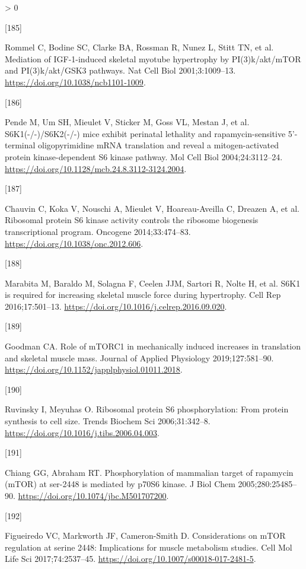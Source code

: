 \documentclass[twoside,10pt]{gihclass} %
\newlength{\cslhangindent}
\newlength{\csllabelwidth}
\newenvironment{CSLReferences}[3] %
 {%
  \setlength{\parindent}{0pt}
  \ifodd #1 \everypar{\setlength{\hangindent}{\cslhangindent}}\ignorespaces\fi
  \ifnum #2 > 0
  \setlength{\parskip}{#2\baselineskip}
  \fi
 }%
 {}
\newcommand{\CSLLeftMargin}[1]{\parbox[t]{\maxof{\widthof{#1}}{\csllabelwidth}}{#1}}
\newcommand{\CSLRightInline}[1]{\parbox[t]{\linewidth}{#1}}
\begin{document}
\begin{CSLReferences}{0}{0}
\leavevmode\hypertarget{ref-RN783}{}%
\CSLLeftMargin{{[}185{]} }
\CSLRightInline{Rommel C, Bodine SC, Clarke BA, Rossman R, Nunez L, Stitt TN, et al. Mediation of IGF-1-induced skeletal myotube hypertrophy by PI(3)k/akt/mTOR and PI(3)k/akt/GSK3 pathways. Nat Cell Biol 2001;3:1009--13. \url{https://doi.org/10.1038/ncb1101-1009}.}

\leavevmode\hypertarget{ref-RN2827}{}%
\CSLLeftMargin{{[}186{]} }
\CSLRightInline{Pende M, Um SH, Mieulet V, Sticker M, Goss VL, Mestan J, et al. S6K1(-/-)/S6K2(-/-) mice exhibit perinatal lethality and rapamycin-sensitive 5'-terminal oligopyrimidine mRNA translation and reveal a mitogen-activated protein kinase-dependent S6 kinase pathway. Mol Cell Biol 2004;24:3112--24. \url{https://doi.org/10.1128/mcb.24.8.3112-3124.2004}.}

\leavevmode\hypertarget{ref-RN2321}{}%
\CSLLeftMargin{{[}187{]} }
\CSLRightInline{Chauvin C, Koka V, Nouschi A, Mieulet V, Hoareau-Aveilla C, Dreazen A, et al. Ribosomal protein S6 kinase activity controls the ribosome biogenesis transcriptional program. Oncogene 2014;33:474--83. \url{https://doi.org/10.1038/onc.2012.606}.}

\leavevmode\hypertarget{ref-RN2849}{}%
\CSLLeftMargin{{[}188{]} }
\CSLRightInline{Marabita M, Baraldo M, Solagna F, Ceelen JJM, Sartori R, Nolte H, et al. S6K1 is required for increasing skeletal muscle force during hypertrophy. Cell Rep 2016;17:501--13. \url{https://doi.org/10.1016/j.celrep.2016.09.020}.}

\leavevmode\hypertarget{ref-RN2320}{}%
\CSLLeftMargin{{[}189{]} }
\CSLRightInline{Goodman CA. Role of mTORC1 in mechanically induced increases in translation and skeletal muscle mass. Journal of Applied Physiology 2019;127:581--90. \url{https://doi.org/10.1152/japplphysiol.01011.2018}.}

\leavevmode\hypertarget{ref-RN2824}{}%
\CSLLeftMargin{{[}190{]} }
\CSLRightInline{Ruvinsky I, Meyuhas O. Ribosomal protein S6 phosphorylation: From protein synthesis to cell size. Trends Biochem Sci 2006;31:342--8. \url{https://doi.org/10.1016/j.tibs.2006.04.003}.}

\leavevmode\hypertarget{ref-RN1902}{}%
\CSLLeftMargin{{[}191{]} }
\CSLRightInline{Chiang GG, Abraham RT. Phosphorylation of mammalian target of rapamycin (mTOR) at ser-2448 is mediated by p70S6 kinase. J Biol Chem 2005;280:25485--90. \url{https://doi.org/10.1074/jbc.M501707200}.}

\leavevmode\hypertarget{ref-RN1949}{}%
\CSLLeftMargin{{[}192{]} }
\CSLRightInline{Figueiredo VC, Markworth JF, Cameron-Smith D. Considerations on mTOR regulation at serine 2448: Implications for muscle metabolism studies. Cell Mol Life Sci 2017;74:2537--45. \url{https://doi.org/10.1007/s00018-017-2481-5}.}


\end{CSLReferences}
\end{document}
